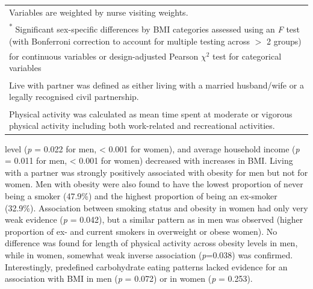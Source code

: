 \begin{table}
\begin{tabular}[t]{lcccccccc}
			\multicolumn{9}{l}{{\scriptsize Variables are weighted by nurse visiting weights.}}\\
			\multicolumn{9}{l}{{\scriptsize \textsuperscript{*} Significant sex-specific differences by BMI categories assessed using an \textit{F} test (with Bonferroni correction to account for multiple testing across $>$ 2 groups)}} \\ 
			\multicolumn{9}{l}{{\scriptsize for continuous variables or design-adjusted Pearson $\chi^2$ test for categorical variables}}\\
			\multicolumn{9}{l}{{\scriptsize \textsuperscript{\ddag} Live with partner was defined as either living with a married husband/wife or a legally recognised civil partnership.}}\\
			\multicolumn{9}{l}{{\scriptsize \textsuperscript{\dag} Physical activity was calculated as mean time spent at moderate or vigorous physical activity including both work-related and recreational activities.}}\\
		\end{tabular}
	
\end{table}

level (\textit{p} = 0.022 for men, < 0.001 for women), and average household income (\textit{p} = 0.011 for men, < 0.001 for women) decreased with increases in BMI. Living with a partner was strongly positively associated with obesity for men but not for women. Men with obesity were also found to have the lowest proportion of never being a smoker (47.9\%) and the highest proportion of being an ex-smoker (32.9\%). Association between smoking status and obesity in women had only very weak evidence (\textit{p} = 0.042), but a similar pattern as in men was observed (higher proportion of ex- and current smokers in overweight or obese women). No difference was found for length of physical activity across obesity levels in men, while in women, somewhat weak inverse association (\textit{p}=0.038) was confirmed. Interestingly, predefined carbohydrate eating patterns lacked evidence for an association with BMI in men (\textit{p} = 0.072) or in women (\textit{p} = 0.253). 


